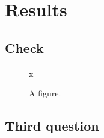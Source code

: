 \section{Results}\label{sec:results}
\subsection{Check}\label{sec:check}
\begin{figure}\centering x\label{sec:rq2}\caption{A figure.}\label{fig:x}\end{figure}
\subsection{Third question}\label{sec:rq3}
